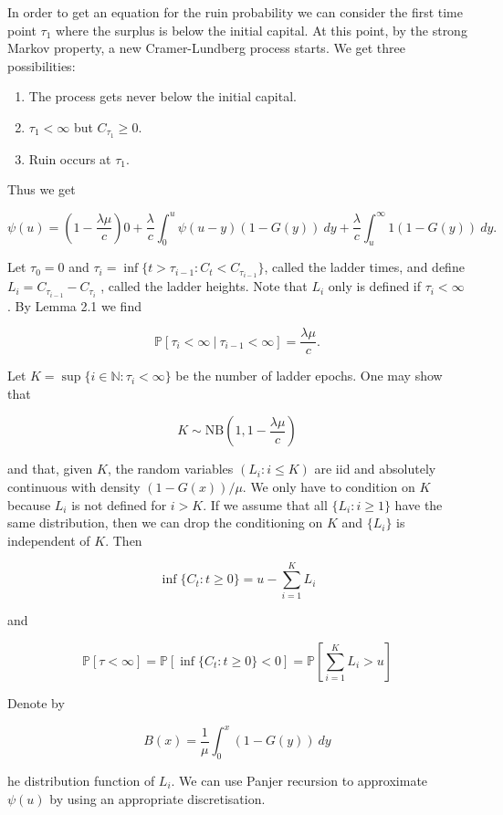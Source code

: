 \documentclass[a4paper,12pt,openany]{book}
\providecommand{\tightlist}{%
 \setlength{\itemsep}{0pt}\setlength{\parskip}{0pt}}
\begin{document}
In order to get an equation for the ruin probability we can consider the first time point \(\tau_1\) where the surplus is below the initial capital. At this point, by the strong Markov property, a new Cramer-Lundberg process starts. We get three possibilities:

\begin{enumerate}
\def\labelenumi{\roman{enumi})}
\tightlist
\item
  The process gets never below the initial capital.
\item
  \(\tau_1 <\infty\) but \(C_{\tau_1}\ge 0\).
\item
  Ruin occurs at \(\tau_1\).
\end{enumerate}

Thus we get

\[
\psi(u)=\left(1-\frac{\lambda \mu}{c}\right)0+\frac{\lambda}{c}\int_0^u\psi(u-y)(1-G(y))\ dy+\frac{\lambda}{c}\int_u^\infty 1(1-G(y))\ dy.
\]

Let \(\tau_0 = 0\) and \(\tau_i = \inf\{t > \tau_{i−1} : C_t < C_{\tau_{i-1}}\}\), called the ladder times, and define \(L_i = C_{\tau_{i−1}} − C_{\tau_i}\) , called the ladder heights. Note that \(L_i\) only is defined if \(\tau_i <\infty\). By Lemma 2.1 we find

\[
\mathbb P[\tau_i<\infty\ \vert\ \tau_{i-1}<\infty]=\frac{\lambda \mu}{c}.
\]

Let \(K = \sup\{i \in\mathbb N : \tau_i < \infty\}\) be the number of ladder epochs. One may show that

\[
K \sim \text{NB}\left(1, 1 − \frac{\lambda \mu}{c}\right)
\]

and that, given \(K\), the random variables \((L_i : i \le K)\) are iid and absolutely continuous with density \((1 − G(x))/\mu\). We only have to condition on \(K\) because \(L_i\) is not defined for \(i > K\). If we assume that all \(\{L_i : i \ge 1\}\) have the same distribution, then we can drop the conditioning on \(K\) and \(\{L_i\}\) is independent of \(K\). Then

\[
\inf\{C_t : t\ge 0\}=u-\sum_{i=1}^K L_i
\]

and

\[
\mathbb P[\tau <\infty]=\mathbb P[\inf\{C_t : t\ge 0\}<0]=\mathbb P\left[\sum_{i=1}^K L_i> u\right]
\]

Denote by

\[
B(x)=\frac{1}{\mu}\int_0^x(1-G(y))\ dy
\]

he distribution function of \(L_i\). We can use Panjer recursion to approximate \(\psi(u)\) by using an appropriate discretisation.
\end{document}
